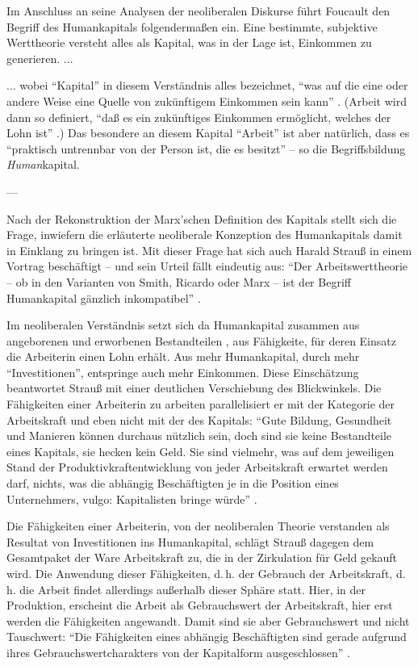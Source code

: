 \documentclass[12pt,
               DIV13,
               paper=a4,
               twoside=false,
               onehalfspacing,
               bibliography=totoc,
               toc=graduated,
               draft,
               ]{scrartcl}
\newcommand{\pc}[2]{\parencite[#1]{#2}}
\newcommand{\vgl}[2]{\parencite[vgl.][#1]{#2}}
\newcommand{\worries}[1]{\ifdraft{\textcolor{blue}{\texttt{(#1)}}}{}}
\begin{document}
Im Anschluss an seine Analysen der neoliberalen Diskurse führt
Foucault den Begriff des Humankapitals folgendermaßen ein. Eine
bestimmte, subjektive Werttheorie versteht alles als Kapital, was in der
Lage ist, Einkommen zu generieren. ... \worries{?}

... wobei "`Kapital"' in diesem Verständnis alles bezeichnet, "`was
auf die eine oder andere Weise eine Quelle von zukünftigem Einkommen
sein kann"' \pc{312}{gbp}. (Arbeit wird dann so definiert, "`daß es
ein zukünftiges Einkommen ermöglicht, welches der Lohn ist"'
\pc{312}{gbp}.) Das besondere an diesem Kapital "`Arbeit"' ist aber
natürlich, dass es "`praktisch untrennbar von der Person ist, die es
besitzt"' \pc{312}{gbp} -- so die Begriffsbildung \emph{Human}kapital.

---

Nach der Rekonstruktion der Marx'schen Definition des Kapitals stellt
sich die Frage, inwiefern die erläuterte neoliberale Konzeption des
Humankapitals damit in Einklang zu bringen ist. Mit dieser Frage hat
sich auch Harald Strauß in einem Vortrag beschäftigt -- und sein
Urteil fällt eindeutig aus: "`Der Arbeitswerttheorie -- ob in den
Varianten von Smith, Ricardo oder Marx -- ist der Begriff Humankapital
gänzlich inkompatibel"' \pc{124}{strauss}.

Im neoliberalen Verständnis setzt sich da Humankapital zusammen aus
angeborenen und erworbenen Bestandteilen \vgl{316}{gbp}, aus
Fähigkeite, für deren Einsatz die Arbeiterin einen Lohn erhält. Aus
mehr Humankapital, durch mehr "`Investitionen"', entspringe auch mehr
Einkommen. Diese Einschätzung beantwortet Strauß mit einer deutlichen
Verschiebung des Blickwinkels. Die Fähigkeiten einer Arbeiterin zu
arbeiten parallelisiert er mit der Kategorie der Arbeitskraft und eben
nicht mit der des Kapitals: "`Gute Bildung, Gesundheit und Manieren
können durchaus nützlich sein, doch sind sie keine Bestandteile eines
Kapitals, sie hecken kein Geld. Sie sind vielmehr, was auf dem
jeweiligen Stand der Produktivkraftentwicklung von jeder Arbeitskraft
erwartet werden darf, nichts, was die abhängig Beschäftigten je in die
Position eines Unternehmers, vulgo: Kapitalisten bringe würde"'
\pc{128}{strauss}.

Die Fähigkeiten einer Arbeiterin, von der neoliberalen Theorie
verstanden als Resultat von Investitionen ins Humankapital, schlägt
Strauß dagegen dem Gesamtpaket der Ware Arbeitskraft zu, die in der
Zirkulation für Geld gekauft wird. Die Anwendung dieser Fähigkeiten,
d.\,h. der Gebrauch der Arbeitskraft, d.\,h. die Arbeit findet
allerdings außerhalb dieser Sphäre statt. Hier, in der Produktion,
erscheint die Arbeit als Gebrauchswert der Arbeitskraft, hier erst
werden die Fähigkeiten angewandt. Damit sind sie aber Gebrauchswert
und nicht Tauschwert: "`Die Fähigkeiten eines abhängig Beschäftigten
sind gerade aufgrund ihres Gebrauchswertcharakters von der Kapitalform
ausgeschlossen"' \pc{126}{strauss}.
\end{document}
